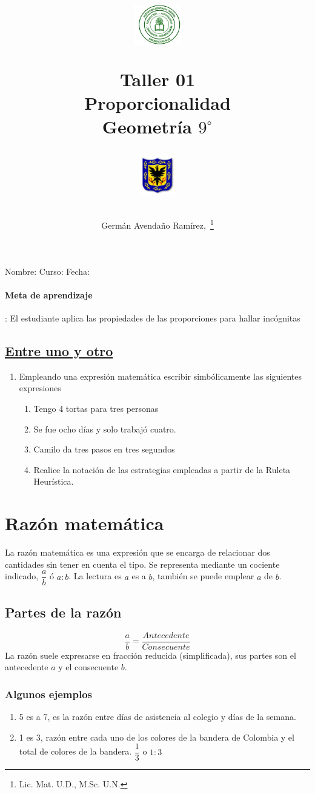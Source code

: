 \documentclass[10pt,twoside]{article}
\author{Germ\'an Avenda\~no Ram\'irez,~\thanks{Lic. Mat. U.D., M.Sc. U.N.}}
\title{\begin{minipage}{.2\textwidth}
\includegraphics[height=1.75cm]{Images/logo-colegio.png}\end{minipage}
\begin{minipage}{.55\textwidth}
\begin{center}
Taller 01\\
Proporcionalidad\\
Geometr\'{i}a $9^{\circ}$
\end{center}
\end{minipage}\hfill
\begin{minipage}{.2\textwidth}
\includegraphics[height=1.75cm]{Images/logo-sed.png} 
\end{minipage}}
\date{}
\begin{document}
\maketitle
Nombre: \hrulefill Curso: \underline{\hspace*{44pt}} Fecha: \underline{\hspace*{2.5cm}}
\paragraph*{Meta de aprendizaje}: El estudiante aplica las propiedades de las proporciones para hallar incógnitas
\subsection*{\underline{Entre uno y otro}}
\begin{enumerate}
\item Empleando una expresi\'{o}n matem\'{a}tica escribir simb\'{o}licamente las siguientes expresiones
\begin{enumerate}
\item Tengo 4 tortas para tres personas
\item Se fue ocho d\'{i}as y solo trabaj\'{o} cuatro.
\item Camilo da tres pasos en tres segundos
\item Realice la notaci\'{o}n de las estrategias empleadas a partir de la Ruleta Heur\'{i}stica.
\end{enumerate}
\end{enumerate}
\section*{Raz\'{o}n matem\'{a}tica}
La razón matemática es una expresión que se encarga de relacionar dos cantidades sin tener en cuenta el tipo. Se representa mediante un cociente indicado, $\dfrac{a}{b}$ \'{o} $a:b$. La lectura es $a$ es a $b$, también se puede emplear $a$ de $b$.
\subsection*{Partes de la raz\'{o}n}
 \[\dfrac{a}{b}=\dfrac{Antecedente}{Consecuente}\]
 La razón suele expresarse en fracción reducida (simplificada), sus partes son el antecedente $a$ y  el consecuente $b$.
 \subsubsection*{Algunos ejemplos}
 \begin{enumerate}
 \item 5 es a 7, es la razón entre días de asistencia al colegio y días de la semana.
 \item 1 es 3, razón entre cada uno de los colores de la bandera de Colombia y el total de colores de la bandera. $\dfrac{1}{3}$ o $1:3$
 \end{enumerate}
\end{document}
